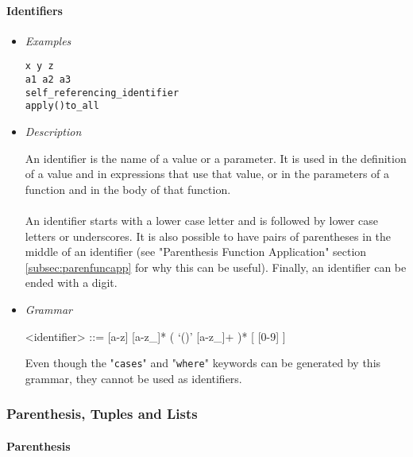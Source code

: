 \documentclass{article}
\begin{document}
\paragraph{Identifiers}
\begin{itemize}

\item \textit{Examples}
\begin{verbatim}
x y z
a1 a2 a3 
self_referencing_identifier 
apply()to_all
\end{verbatim}

\item \textit{Description}

An identifier is the name of a value or a parameter. It is used in the
definition of a value and in expressions that use that value, or in the
parameters of a function and in the body of that function.
\\\\
An identifier starts with a lower case letter and is followed by lower case
letters or underscores. It is also possible to have pairs of parentheses in the
middle of an identifier (see "Parenthesis Function Application" section
\ref{subsec:parenfuncapp} for why this can be useful).  Finally, an identifier
can be ended with a digit.

\item \textit{Grammar}
\begin{grammar}
<identifier> ::= [a-z] [a-z_]* ( `()' [a-z_]+ )* [ [0-9] ]
\end{grammar}
Even though the "\texttt{cases}" and "\texttt{where}" keywords can be generated
by this grammar, they cannot be used as identifiers.

\end{itemize}

\newpage
\subsubsection{Parenthesis, Tuples and Lists}

\paragraph{Parenthesis}
\end{document}
